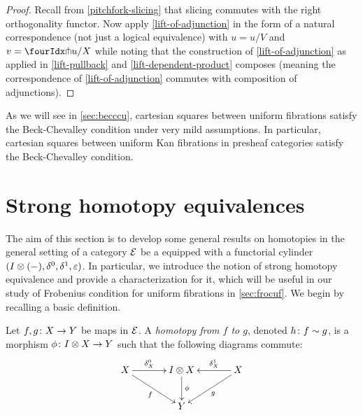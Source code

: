 \documentclass[reqno,10pt,a4paper,oneside,draft]{amsart}
\begin{document}
\begin{proof}
Recall from \cref{pitchfork-slicing} that slicing commutes with the right orthogonality functor.
Now apply \cref{lift-of-adjunction} in the form of a natural correspondence (not just a logical equivalence) with $u = u/V$ and $v = \liftr{u}/X$ while noting that the construction of \cref{lift-of-adjunction} as applied in \cref{lift-pullback} and \cref{lift-dependent-product} composes (meaning the correspondence of \cref{lift-of-adjunction} commutes with composition of adjunctions).
\end{proof}

As we will see in \cref{sec:becccu}, cartesian squares between uniform fibrations satisfy the Beck-Chevalley condition under very mild assumptions.
In particular, cartesian squares between uniform Kan fibrations in presheaf categories satisfy the Beck-Chevalley condition.


\section{Strong homotopy equivalences}
\label{sec:strhe}

The aim of this section is to develop some general results on homotopies in the general setting of a category $\mathcal{E}$ be a equipped with a functorial cylinder $(I \otimes (-), \delta^0, \delta^1, \varepsilon)$.
In particular, we introduce the notion of strong homotopy equivalence and provide a characterization for it, which will be useful in our study of Frobenius condition for uniform fibrations in \cref{sec:frocuf}.
We begin by recalling a basic definition.

\begin{definition} \label{def:homotopy}
Let $f, g \colon X \to Y$ be maps in $\mathcal{E}$.
A \emph{homotopy from $f$ to $g$}, denoted $h \colon f \sim g$, is a morphism
$\phi \colon I \otimes X \to Y$ such that the following diagrams commute:
\[
\xymatrix@C=1.2cm{
  X \ar[r]^-{\lcyl_X} \ar[dr]_{f} & \interval \otimes X \ar[d]^-{\phi} & X \ar[dl]^{g} \ar[l]_-{\rcyl_X} \\
  & Y &
}
\]
\end{definition}
\end{document}
